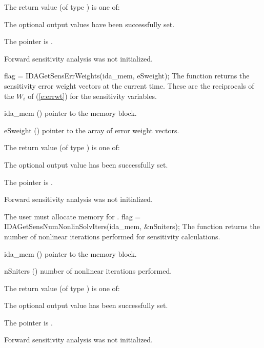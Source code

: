 {
  The return value  (of type ) is one of:
  \begin{args}
  \item[\Id{IDA\_SUCCESS}] 
    The optional output values have been successfully set.
  \item[\Id{IDA\_MEM\_NULL}]
    The  pointer is .
  \item[\Id{IDA\_NO\_SENS}]
    Forward sensitivity analysis was not initialized.
  \end{args}
}
{}
{
  flag = IDAGetSensErrWeights(ida\_mem, eSweight);
}
{
  The function  returns the sensitivity error weight
  vectors at the current time. These are the reciprocals of the $W_i$ of
  (\ref{e:errwt}) for the sensitivity variables.
}
{
  \begin{args}
  \item[ida\_mem] ()
    pointer to the {\idas} memory block.
  \item[eSweight] ()
    pointer to the array of error weight vectors.
  \end{args}
}
{
  The return value  (of type ) is one of:
  \begin{args}
  \item[\Id{IDA\_SUCCESS}] 
    The optional output value has been successfully set.
  \item[\Id{IDA\_MEM\_NULL}]
    The  pointer is .
  \item[\Id{IDA\_NO\_SENS}]
    Forward sensitivity analysis was not initialized.
  \end{args}
}
{
  The user must allocate memory for .
}
{
  flag = IDAGetSensNumNonlinSolvIters(ida\_mem, \&nSniters);
}
{
  The function  returns the
  number of nonlinear iterations performed for 
  sensitivity calculations.
}
{
  \begin{args}
  \item[ida\_mem] ()
    pointer to the {\idas} memory block.
  \item[nSniters] ()
    number of nonlinear iterations performed.
  \end{args}
}
{
  The return value  (of type ) is one of:
  \begin{args}
  \item[\Id{IDA\_SUCCESS}] 
    The optional output value has been successfully set.
  \item[\Id{IDA\_MEM\_NULL}]
    The  pointer is .
  \item[\Id{IDA\_NO\_SENS}]
    Forward sensitivity analysis was not initialized.
  \end{args}
}
